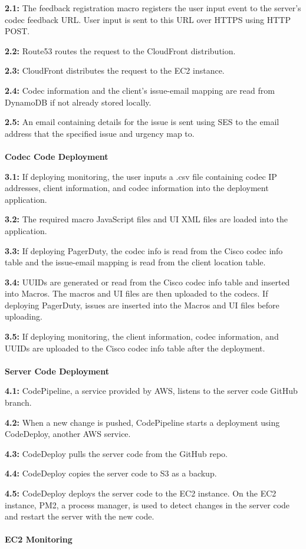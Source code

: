 \documentclass[letterpaper,12pt]{article}
\begin{document}
\textbf{2.1:} The feedback registration macro registers the user input event to the server's codec feedback URL. User input is sent to this URL over HTTPS using HTTP POST.

\textbf{2.2:} Route53 routes the request to the CloudFront distribution.

\textbf{2.3:} CloudFront distributes the request to the EC2 instance.

\textbf{2.4:} Codec information and the client's issue-email mapping are read from DynamoDB if not already stored locally.

\textbf{2.5:} An email containing details for the issue is sent using SES to the email address that the specified issue and urgency map to.\\
\\
\textbf{Codec Code Deployment}

\textbf{3.1:} If deploying monitoring, the user inputs a .csv file containing codec IP addresses, client information, and codec information into the deployment application.

\textbf{3.2:} The required macro JavaScript files and UI XML files are loaded into the application.

\textbf{3.3:} If deploying PagerDuty, the codec info is read from the Cisco codec info table and the issue-email mapping is read from the client location table.

\textbf{3.4:} UUIDs are generated or read from the Cisco codec info table and inserted into Macros. The macros and UI files are then uploaded to the codecs. If deploying PagerDuty, issues are inserted into the Macros and UI files before uploading. 

\textbf{3.5:} If deploying monitoring, the client information, codec information, and UUIDs are uploaded to the Cisco codec info table after the deployment.\\
\\
\textbf{Server Code Deployment}

\textbf{4.1:} CodePipeline, a service provided by AWS, listens to the server code GitHub branch.

\textbf{4.2:} When a new change is pushed, CodePipeline starts a deployment using CodeDeploy, another AWS service.

\textbf{4.3:} CodeDeploy pulls the server code from the GitHub repo.

\textbf{4.4:} CodeDeploy copies the server code to S3 as a backup.

\textbf{4.5:} CodeDeploy deploys the server code to the EC2 instance. On the EC2 instance, PM2, a process manager, is used to detect changes in the server code and restart the server with the new code.\\
\\
\textbf{EC2 Monitoring}
\end{document}
